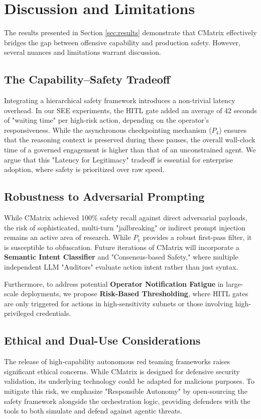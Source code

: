 \section{Discussion and Limitations}
\label{sec:discussion}

The results presented in Section \ref{sec:results} demonstrate that CMatrix effectively bridges the gap between offensive capability and production safety. However, several nuances and limitations warrant discussion.

\subsection{The Capability--Safety Tradeoff}
Integrating a hierarchical safety framework introduces a non-trivial latency overhead. In our SEE experiments, the HITL gate added an average of 42 seconds of "waiting time" per high-risk action, depending on the operator's responsiveness. While the asynchronous checkpointing mechanism ($P_4$) ensures that the reasoning context is preserved during these pauses, the overall wall-clock time of a governed engagement is higher than that of an unconstrained agent. We argue that this "Latency for Legitimacy" tradeoff is essential for enterprise adoption, where safety is prioritized over raw speed.

\subsection{Robustness to Adversarial Prompting}
While CMatrix achieved 100\% safety recall against direct adversarial payloads, the risk of sophisticated, multi-turn "jailbreaking" or indirect prompt injection remains an active area of research. While $P_1$ provides a robust first-pass filter, it is susceptible to obfuscation. Future iterations of CMatrix will incorporate a \textbf{Semantic Intent Classifier} and "Consensus-based Safety," where multiple independent LLM "Auditors" evaluate action intent rather than just syntax. 

Furthermore, to address potential \textbf{Operator Notification Fatigue} in large-scale deployments, we propose \textbf{Risk-Based Thresholding}, where HITL gates are only triggered for actions in high-sensitivity subnets or those involving high-privileged credentials.

\subsection{Ethical and Dual-Use Considerations}
The release of high-capability autonomous red teaming frameworks raises significant ethical concerns. While CMatrix is designed for defensive security validation, its underlying technology could be adapted for malicious purposes. To mitigate this risk, we emphasize "Responsible Autonomy" by open-sourcing the safety framework alongside the orchestration logic, providing defenders with the tools to both simulate and defend against agentic threats.

